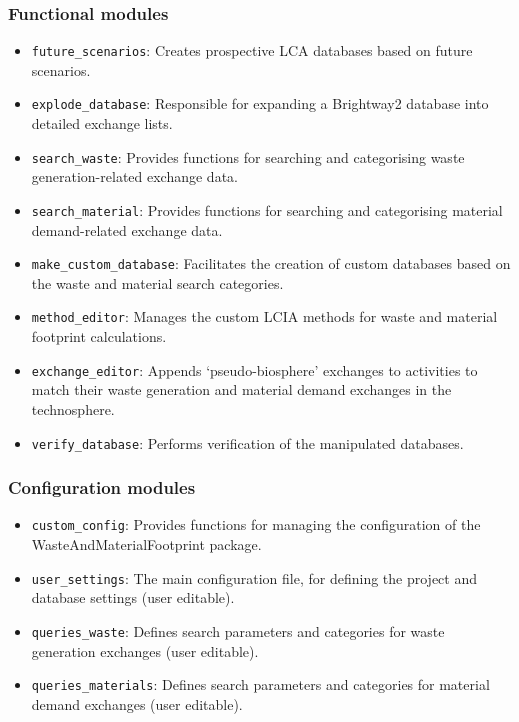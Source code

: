 \subsubsection{Functional modules}
\begin{itemize}
    \item \texttt{future\_scenarios}: Creates prospective LCA databases based on future scenarios.
    \item \texttt{explode\_database}: Responsible for expanding a Brightway2 database into detailed exchange lists.
    \item \texttt{search\_waste}: Provides functions for searching and categorising waste generation-related exchange data.
    \item \texttt{search\_material}: Provides functions for searching and categorising material demand-related exchange data.
    \item \texttt{make\_custom\_database}: Facilitates the creation of custom databases based on the waste and material search categories.
    \item \texttt{method\_editor}: Manages the custom LCIA methods for waste and material footprint calculations.
    \item \texttt{exchange\_editor}: Appends `pseudo-biosphere' exchanges to activities to match their waste generation and material demand exchanges in the technosphere.
    \item \texttt{verify\_database}: Performs verification of the manipulated databases.
\end{itemize}

\subsubsection{Configuration modules}
\begin{itemize}
    \item \texttt{custom\_config}: Provides functions for managing the configuration of the WasteAndMaterialFootprint package.
    \item \texttt{user\_settings}: The main configuration file, for defining the project and database settings (user editable).
    \item \texttt{queries\_waste}: Defines search parameters and categories for waste generation exchanges (user editable).
    \item \texttt{queries\_materials}: Defines search parameters and categories for material demand exchanges (user editable).
\end{itemize}

